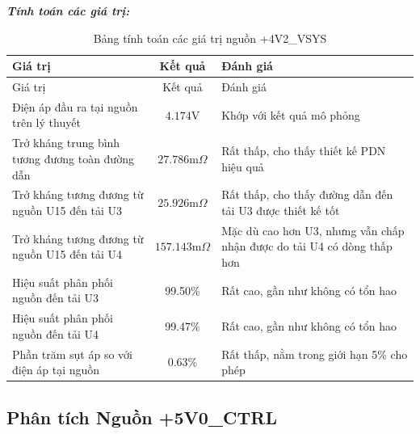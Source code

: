             \textbf{\textit{Tính toán các giá trị:}}
            \begin{longtable}{|p{}|c|p{}|}           
                \caption{Bảng tính toán các giá trị nguồn +4V2\_VSYS}\\
                \hline
                Giá trị & Kết quả & Đánh giá \\
                \hline
                \endfirsthead
                
                \hline
                Giá trị & Kết quả & Đánh giá \\
                \hline
                \endhead
                
                \hline
                \endfoot
                
                \hline
                \endlastfoot
                
                Điện áp đầu ra tại nguồn trên lý thuyết & $4.174\text{V}$ & Khớp với kết quả mô phỏng \\
                Trở kháng trung bình tương đương toàn đường dẫn & $27.786\text{m}\Omega$ & Rất thấp, cho thấy thiết kế PDN hiệu quả \\
                Trở kháng tương đương từ nguồn U15 đến tải U3 & $25.926\text{m}\Omega$ & Rất thấp, cho thấy đường dẫn đến tải U3 được thiết kế tốt \\
                Trở kháng tương đương từ nguồn U15 đến tải U4 & $157.143\text{m}\Omega$ & Mặc dù cao hơn U3, nhưng vẫn chấp nhận được do tải U4 có dòng thấp hơn \\
                Hiệu suất phân phối nguồn đến tải U3 & 99.50\% & Rất cao, gần như không có tổn hao \\
                Hiệu suất phân phối nguồn đến tải U4 & 99.47\% & Rất cao, gần như không có tổn hao \\
                Phần trăm sụt áp so với điện áp tại nguồn & $\mathbf{0.63\%}$ & Rất thấp, nằm trong giới hạn 5\% cho phép
                \label{tab:4v2_vsys_current_density_calculation}\\

                \hline
            \end{longtable}
            
        \newpage
        \subsection{Phân tích Nguồn +5V0\_CTRL}
                
